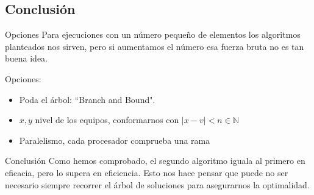 \subsection{Conclusión}
\begin{frame}
	\begin{block}{Opciones}
	Para ejecuciones con un número pequeño de elementos los algoritmos planteados nos sirven, 
	pero si aumentamos el número esa fuerza bruta no es tan buena idea.
	
	Opciones:
	\begin{itemize}
		\item Poda el árbol: ``Branch and Bound".
		\item $x,y$ nivel de los equipos, conformarnos con $|x-v|<n\in\mathbb{N}$
		\item Paralelismo, cada procesador comprueba una rama
	\end{itemize}
	\end{block}
	
	\pause
	\begin{alertblock}{Conclusión}
	Como hemos comprobado, el segundo algoritmo iguala al primero en eficacia, pero lo supera
	en eficiencia.
	Esto nos hace pensar que puede no ser necesario siempre recorrer el árbol de soluciones 
	para asegurarnos la optimalidad.
	\end{alertblock}
\end{frame}